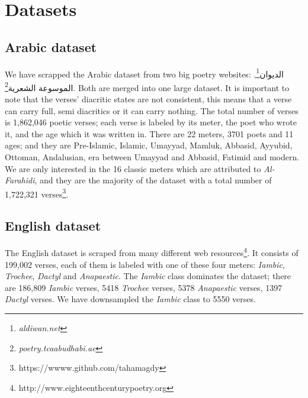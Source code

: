 \documentclass[12pt]{report}
\begin{document}



\section{Datasets}
\subsection{Arabic dataset}
We have scrapped the Arabic dataset from two big poetry websites:
\textarabic{الديوان}\footnote{\textit{aldiwan.net}}, \textarabic{الموسوعة
الشعرية}\footnote{\textit{poetry.tcaabudhabi.ae}}. Both are merged into one large
dataset. It is important to note that the verses' diacritic states are not
consistent, this means that a verse can carry full, semi diacritics or it can
carry nothing. The total number of verses is  1,862,046 poetic verses; each verse is
labeled by its meter, the poet who wrote it, and the
age which it was written in. There are 22 meters, 3701 poets and 11
ages; and they are Pre-Islamic, Islamic, Umayyad, Mamluk, Abbasid, Ayyubid, Ottoman,
Andalusian, era between Umayyad and Abbasid, Fatimid and modern.  We are only
interested  in the 16 classic meters which are attributed to \textit{Al-Farahidi},
and they are the majority of the dataset with a total number of 1,722,321
verses\footnote{https://wwww.github.com/tahamagdy}.


\begin{center}


\label{data_size}
\end{center}


\subsection{English dataset}
The English dataset is scraped from many different web
resources\footnote{http://www.eighteenthcenturypoetry.org}. It consists of 199,002
verses, each of them is labeled with one of these four meters: \textit{Iambic},
\textit{Trochee}, \textit{Dactyl} and \textit{Anapaestic}.  The \textit{Iambic}
class dominates the dataset; there are  186,809 \textit{Iambic} verses, 5418
\textit{Trochee} verses, 5378  \textit{Anapaestic} verses, 1397 \textit{Dactyl}
verses.  We have downsampled the \textit{Iambic} class to 5550 verses.
\end{document}
